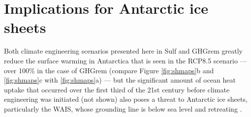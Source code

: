 \documentclass{nature}
\begin{document}
\section{Implications for Antarctic ice sheets}

Both climate engineering scenarios presented here in Sulf and GHGrem greatly reduce the surface warming in Antarctica that is seen in the RCP8.5 scenario --- over 100\% in the case of GHGrem (compare Figure \ref{fig:shmaps}b and \ref{fig:shmaps}c with \ref{fig:shmaps}a) --- but the significant amount of ocean heat uptake that occurred over the first third of the 21st century before climate engineering was initiated (not shown) also poses a threat to Antarctic ice sheets, particularly the WAIS, whose grounding line is below sea level \cite{joughin11} and retreating \cite{rignot14}. %
\end{document}
